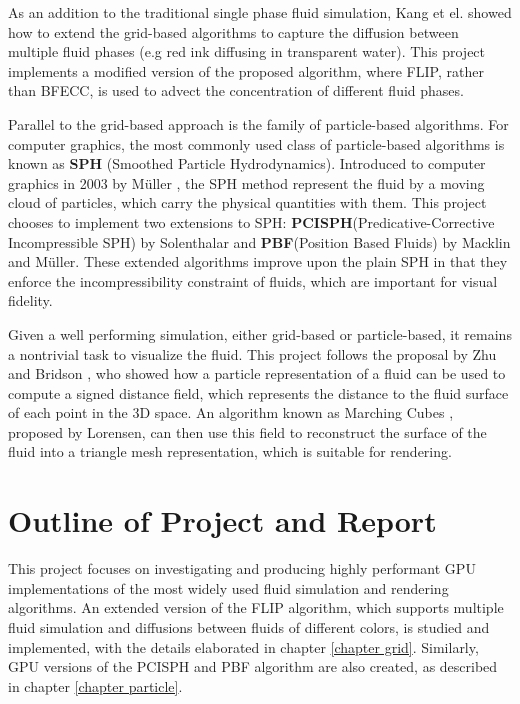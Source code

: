 As an addition to the traditional single phase fluid simulation, Kang et el.\cite{kang2010hybrid} showed how to extend the grid-based algorithms to capture the diffusion between multiple fluid phases (e.g red ink diffusing in transparent water). This project implements a modified version of the proposed algorithm, where FLIP, rather than BFECC, is used to advect the concentration of different fluid phases.

Parallel to the grid-based approach is the family of particle-based algorithms. For computer graphics, the most commonly used class of particle-based algorithms is known as \textbf{SPH} (Smoothed Particle Hydrodynamics). Introduced to computer graphics in 2003 by Müller \cite{muller2003particle}, the SPH method represent the fluid by a moving cloud of particles, which carry the physical quantities with them. This project chooses to implement two extensions to SPH:  \textbf{PCISPH}(Predicative-Corrective Incompressible SPH) by Solenthalar\cite{solenthaler2009predictive} and \textbf{PBF}(Position Based Fluids) by Macklin and Müller\cite{macklin2013position}. These extended algorithms improve upon the plain SPH in that they enforce the incompressibility constraint of fluids, which are important for visual fidelity. 

Given a well performing simulation, either grid-based or particle-based, it remains a nontrivial task to visualize the fluid. This project follows the proposal by Zhu and Bridson \cite{zhu2005animating}, who showed how a particle representation of a fluid can be used to compute a signed distance field, which represents the distance to the fluid surface of each point in the 3D space. An algorithm known as Marching Cubes \cite{lorensen1987marching}, proposed by Lorensen, can then use this field to reconstruct the surface of the fluid into a triangle mesh representation, which is suitable for rendering. 



\section{Outline of Project and Report}


This project focuses on investigating and producing highly performant GPU implementations of the most widely used fluid simulation and rendering algorithms. An extended version of the FLIP algorithm, which supports multiple fluid simulation and diffusions between fluids of different colors, is studied and implemented, with the details elaborated in chapter \ref{chapter grid}. Similarly, GPU versions of the PCISPH and PBF algorithm are also created, as described in chapter \ref{chapter particle}. 

